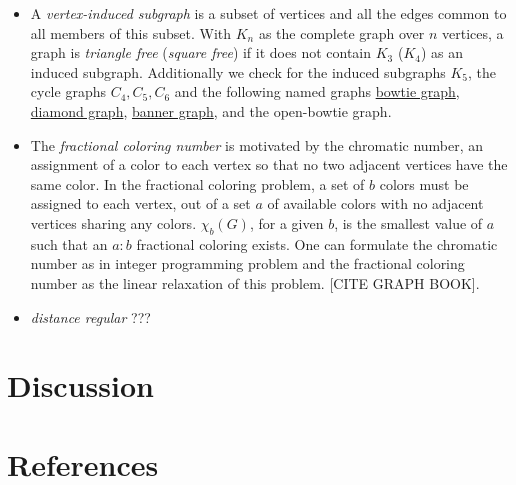 \documentclass[12pt]{article}
\newcommand{\bowtiegraph}{\href{http://mathworld.wolfram.com/ButterflyGraph.html}{bowtie graph}}
\newcommand{\diamondgraph}{\href{http://mathworld.wolfram.com/DiamondGraph.html}{diamond graph}}
\newcommand{\bannergraph}{\href{http://mathworld.wolfram.com/BannerGraph.html}{banner graph}}
\begin{document}
\begin{itemize}
\item A \textit{vertex-induced subgraph} is a subset of vertices and all the edges common to all members of this subset. 
With $K_n$ as the complete graph over $n$ vertices, a graph is \textit{triangle free} (\textit{square free}) if it does not contain $K_3$ ($K_4$) as an induced subgraph.
Additionally we check for the induced subgraphs $K_5$, the cycle graphs $C_4, C_5, C_6$ and the following named graphs \bowtiegraph, \diamondgraph, \bannergraph, and the open-bowtie graph. 

\item The \textit{fractional coloring number} is motivated by the chromatic number, an assignment of a color to each vertex so that no two adjacent vertices have the same color. 
In the fractional coloring problem, a set of $b$ colors must be assigned to each vertex, out of a set $a$ of available colors with no adjacent vertices sharing any colors.
$\chi_b(G)$, for a given $b$, is the smallest value of $a$ such that an $a:b$ fractional coloring exists. 
One can formulate the chromatic number as in integer programming problem and the fractional coloring number as the linear relaxation of this problem. [CITE GRAPH BOOK].

\item \textit{distance regular} ???

\end{itemize}


\section{Discussion}


\section{References}
\end{document}
